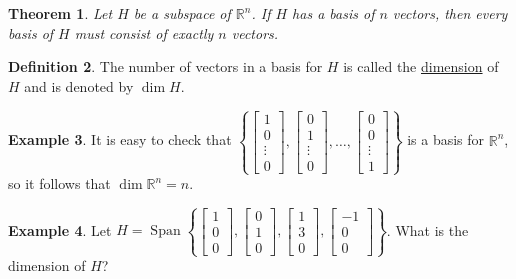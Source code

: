 \documentclass[12pt,letterpaper]{book}
\numberwithin{equation}{section}
\newtheorem{thm}{\textbf{Theorem}}[section]
\theoremstyle{definition}
\newtheorem{defi}[thm]{\textbf{Definition}}
\newtheorem{example}[thm]{\textbf{Example}}
\newcommand{\Span}{\operatorname{Span}}
\begin{document}
\begin{thm} Let $H$ be a subspace of $\mathbb{R}^n$. If $H$ has a basis of $n$ vectors,
then every basis of $H$ must consist of exactly $n$ vectors.
\end{thm}

\begin{defi}
The number of vectors in a basis for $H$ is called the \underline{dimension} of $H$ and is denoted by $\dim H$.
\end{defi}

\begin{example} It is easy to check that $\left\{\left[\begin{array}{r} 1 \\ 0 \\ \vdots \\ 0
\end{array}\right], \left[\begin{array}{r} 0 \\ 1 \\ \vdots \\ 0
\end{array}\right],\ldots, \left[\begin{array}{r} 0 \\ 0 \\ \vdots \\ 1
\end{array}\right] \right\}$ is a basis for $\mathbb{R}^n$, so it follows that $\dim \mathbb{R}^n=n$.
\end{example}

\begin{example} Let $H=\Span\left\{\left[\begin{array}{r} 1 \\ 0 \\ 0
\end{array}\right],\left[\begin{array}{r} 0 \\ 1 \\ 0
\end{array}\right],\left[\begin{array}{r} 1 \\ 3 \\ 0
\end{array}\right],\left[\begin{array}{r} -1 \\ 0 \\ 0
\end{array}\right]\right\}$. What is the dimension of $H$?
\end{example}
\end{document}
